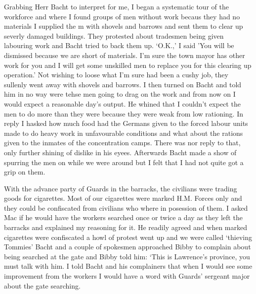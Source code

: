 Grabbing Herr Bacht to interpret for me, I began a systematic tour of
the workforce and where I found groups of men without work becaus they
had no materials I supplied the m with shovels and barrows and sent
them to clear up severly damaged buildings. They protested about
tradesmen being given labouring work and Bacht tried to back them
up. `O.K.,' I said 'You will be dismissed because we are short of
materials. I'm sure the town mayor has other work for you and I will
get some unskilled men to replace you for this clearing up operation.'
Not wishing to loose what I'm sure had been a cushy job, they sullenly
went away with shovels and barrows. I then turned on Bacht and told
him in no way were tehse men going to drag on the work and from now on
I would expect a reasonable day's output. He whined that I couldn't
expect the men to do more than they were because they were weak from
low rationing. In reply I hasked how much food had the Germans given
to the forced labour units made to do heavy work in unfavourable
conditions and what about the rations given to the inmates of the
concentration camps. There was nor reply to that, only further shining
of dislike in his eyees. Afterwards Bacht made a show of spurring the
men on while we were around but I felt that I had not quite got a grip
on them.

With the advance party of Guards in the barracks, the civilians were
trading goods for cigarettes. Most of our cigarettes were marked
H.M. Forces only and they could be confiscated from civilians who
where in posession of them. I asked \sergeantM Mac if he would have the
workers searched once or twice a day as they left the barracks and
explained my reasoning for it. He readily agreed and when marked
cigarettes were confiscated a howl of protest went up and we were
called `thieving Tommies' Bacht and a couple of spokesmen approached
\sergeant Bibby to complain about being searched at the gate and Bibby
told him: `This is \corporal Lawrence's province, you must talk with
him. I told Bacht and his complainers that when I would see some
improvement from the workers I would have a word with Guards' sergeant
major about the gate searching.

